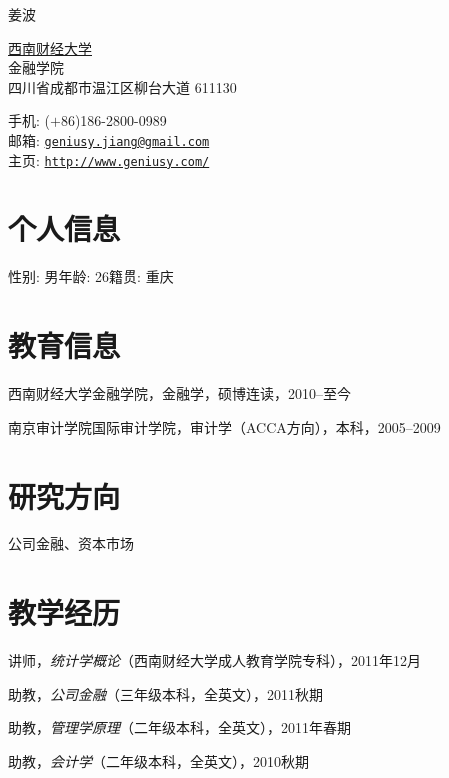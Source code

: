 \documentclass[a4paper]{article}
\def\name{姜波}
\renewenvironment{itemize}{
  \begin{list}{}{
    \setlength{\leftmargin}{1.5em}
    \setlength{\itemsep}{0pt}
  }
}{
  \end{list}
}
\begin{document}
{\huge \name}


\vspace{0.25in}
\begin{minipage}{0.55\linewidth}
  \href{http://www.swufe.edu.cn/}{西南财经大学} \\
  金融学院 \\
  四川省成都市温江区柳台大道 611130
\end{minipage}
\vspace{0.25in}
\begin{minipage}{0.40\linewidth}
  手机: ($+$86)186-2800-0989 \\
  邮箱: \href{mailto:geniusy.jiang@gmail.com}{\tt geniusy.jiang@gmail.com} \\
  主页: \href{http://www.geniusy.com/}{\tt http://www.geniusy.com/}
\end{minipage}

\vspace{-1.5em}
\section*{个人信息}
\begin{itemize}
\item 性别: 男\hspace{1em}年龄: 26\hspace{1em}籍贯: 重庆
\end{itemize}

\section*{教育信息}
\begin{itemize}
  \item 西南财经大学金融学院，金融学，硕博连读，2010--至今
  \item 南京审计学院国际审计学院，审计学（ACCA方向），本科，2005--2009
\end{itemize}

\section*{研究方向}
\begin{itemize}
\item 公司金融、资本市场
\end{itemize}

\section*{教学经历}
\begin{itemize}
\item 讲师，{\it 统计学概论}（西南财经大学成人教育学院专科），2011年12月
\item 助教，{\it 公司金融}（三年级本科，全英文），2011秋期
\item 助教，{\it 管理学原理}（二年级本科，全英文），2011年春期
\item 助教，{\it 会计学}（二年级本科，全英文），2010秋期
\end{itemize}
\end{document}
